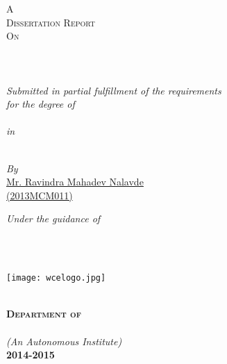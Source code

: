 
\begin{titlepage}
\begin{center}
\textsc{\LARGE A\\Dissertation Report\\[0.2cm]On}\\[0.2cm] %

\HRule \\[0.1cm] %
\vspace{0.5cm}
{\huge \bfseries \ttitle}\\[0.3cm] %
\HRule \\[0.5cm] %

\large{\textit{Submitted in partial fulfillment of the requirements\\ for the degree of}}\\[0.4cm] \textbf{\Large{\textit{\degreename}}}\\

\large{\textit{in}}\\
\textbf{\Large{\textit{\deptname}}}\\[0.5cm]



 \begin{minipage}{0.4\textwidth}
\begin{center} \large
\emph{By}\\[0.3cm]
\href{http://ravindramn.blogspot.in}{Mr. Ravindra Mahadev Nalavde\\ %
(2013MCM011)}
\end{center}
\end{minipage}

\vspace{0.5cm}

\begin{minipage}{0.4\textwidth}
\begin{center} \large
\emph{Under the guidance of} \\ 
{\supname\\ } %
\end{center}
\end{minipage}\\[1cm]

 \begin{minipage}{\textwidth}
\centering
	 \texttt{[image: wcelogo.jpg]}
\end{minipage}\\[1cm]


\textbf{\large{\textsc{Department of \deptname}}}\\ %
 
\textbf{\textsc{\large {\univname}}}\\ %
\textit{\large{(An Autonomous Institute)}}\\[0.3cm]

\textbf{\Large 2014-2015}\\[1cm] %
 
\vfill
\end{center}

\end{titlepage}
